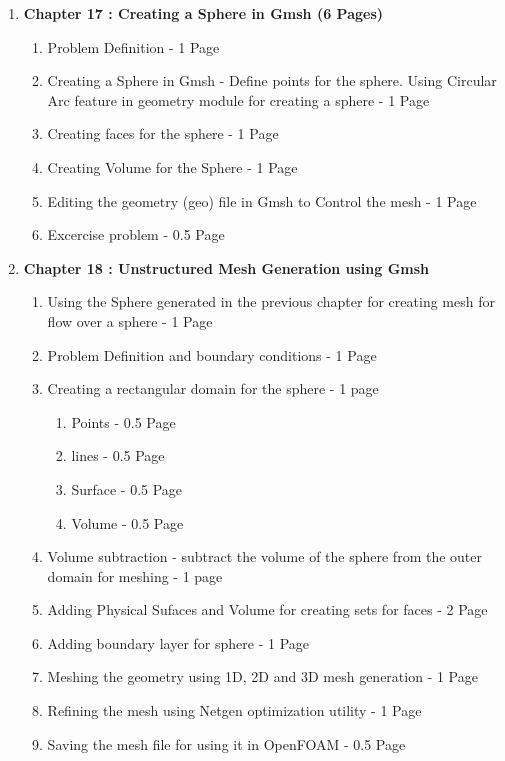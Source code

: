 \documentclass[12pt]{article}
\begin{document}
\begin{enumerate}
\item \textbf{Chapter 17 : Creating a Sphere in Gmsh (6 Pages)}
\begin{enumerate}[label*=\arabic*.]
\item Problem Definition - 1 Page
\item Creating a Sphere in Gmsh - Define points for the sphere. Using Circular Arc feature in geometry module for creating a sphere - 1 Page
\item Creating faces for the sphere - 1 Page
\item Creating Volume for the Sphere - 1 Page
\item Editing the geometry (geo) file in Gmsh to Control the mesh - 1 Page 
\item Excercise problem - 0.5 Page
\end{enumerate}


\item \textbf{Chapter 18 : Unstructured Mesh Generation using Gmsh}
\begin{enumerate}[label*=\arabic*.]
\item Using the Sphere generated in the previous chapter for creating mesh for flow over a sphere - 1 Page
\item Problem Definition and boundary conditions - 1 Page
\item Creating a rectangular domain for the sphere - 1 page
\begin{enumerate}[label*=\arabic*.]
\item Points - 0.5 Page
\item lines - 0.5 Page 
\item Surface - 0.5 Page
\item Volume - 0.5 Page
\end{enumerate}
\item Volume subtraction - subtract the volume of the sphere from the outer domain for meshing - 1 page
\item Adding Physical Sufaces and Volume for creating sets for faces - 2 Page
\item Adding boundary layer for sphere - 1 Page
\item Meshing the geometry using 1D, 2D and 3D mesh generation - 1 Page
\item Refining the mesh using Netgen optimization utility - 1 Page
\item Saving the mesh file for using it in OpenFOAM - 0.5 Page
\end{enumerate}
\end{enumerate}
\end{document}

